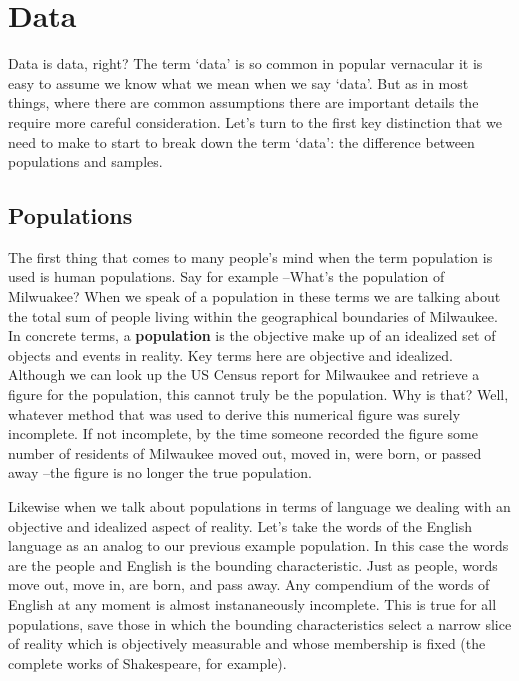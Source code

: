 \documentclass[
  letterpaper,
]{scrbook}
\begin{document}
\hypertarget{data}{%
\section{Data}\label{data}}

Data is data, right? The term `data' is so common in popular vernacular
it is easy to assume we know what we mean when we say `data'. But as in
most things, where there are common assumptions there are important
details the require more careful consideration. Let's turn to the first
key distinction that we need to make to start to break down the term
`data': the difference between populations and samples.

\hypertarget{populations}{%
\subsection{Populations}\label{populations}}

The first thing that comes to many people's mind when the term
population is used is human populations. Say for example --What's the
population of Milwuakee? When we speak of a population in these terms we
are talking about the total sum of people living within the geographical
boundaries of Milwaukee. In concrete terms, a
\textbf{population} is the objective make up of an
idealized set of objects and events in reality. Key terms here are
objective and idealized. Although we can look up the US Census report
for Milwaukee and retrieve a figure for the population, this cannot
truly be the population. Why is that? Well, whatever method that was
used to derive this numerical figure was surely incomplete. If not
incomplete, by the time someone recorded the figure some number of
residents of Milwaukee moved out, moved in, were born, or passed away
--the figure is no longer the true population.

Likewise when we talk about populations in terms of language we dealing
with an objective and idealized aspect of reality. Let's take the words
of the English language as an analog to our previous example population.
In this case the words are the people and English is the bounding
characteristic. Just as people, words move out, move in, are born, and
pass away. Any compendium of the words of English at any moment is
almost instananeously incomplete. This is true for all populations, save
those in which the bounding characteristics select a narrow slice of
reality which is objectively measurable and whose membership is fixed
(the complete works of Shakespeare, for example).
\end{document}
